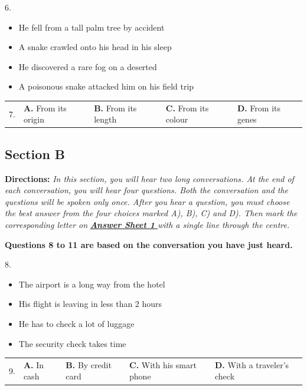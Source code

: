 \documentclass[UTF8,11pt]{ctexart}
\begin{document}
6.


\begin{itemize}[leftmargin=2em,itemsep=.2em,topsep=.4em]\item[A.] He fell from a tall palm tree by accident
\item[B.] A snake crawled onto his head in his sleep
\item[C.] He discovered a rare fog on a deserted
\item[D.] A poisonous snake attacked him on his field trip
\end{itemize}

\noindent\begin{tabularx}{\linewidth}{@{}lXXXX@{}}7. & \textbf{A.} From its origin & \textbf{B.} From its length & \textbf{C.} From its colour & \textbf{D.} From its genes\\\end{tabularx}\par

\subsection*{\textbf{Section B}}


\textbf{Directions:}\textit{ In this section, you will hear two long conversations. At the end of each conversation,} \textit{you will hear four questions. Both the conversation and the questions will be spoken only once. After you} \textit{hear a question, you must choose the best answer from the four choices marked A), B), C) and D). Then} \textit{mark the corresponding letter on}\textbf{\textit{ }}\textbf{\textit{\uline{Answer Sheet 1}}}\textit{\uline{ }}\textit{with a single line through the centre.}


\textbf{Questions 8 to 11 are based on the conversation you have just heard.}


8.


\begin{itemize}[leftmargin=2em,itemsep=.2em,topsep=.4em]\item[A.] The airport is a long way from the hotel
\item[B.] His flight is leaving in less than 2 hours
\item[C.] He has to check a lot of luggage
\item[D.] The security check takes time
\end{itemize}

\noindent\begin{tabularx}{\linewidth}{@{}lXXXX@{}}9. & \textbf{A.} In cash & \textbf{B.} By credit card & \textbf{C.} With his smart phone & \textbf{D.} With a traveler’s check\\\end{tabularx}\par
\end{document}
